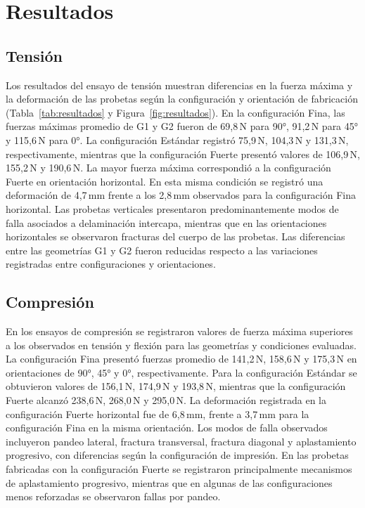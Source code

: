 \documentclass[10pt,twocolumn]{article}
\begin{document}
\section{Resultados}
\subsection{Tensión}
Los resultados del ensayo de tensión muestran diferencias en la fuerza máxima y la deformación de las probetas según la configuración y orientación de fabricación (Tabla~\ref{tab:resultados} y Figura~\ref{fig:resultados}). En la configuración Fina, las fuerzas máximas promedio de G1 y G2 fueron de 69,8\,N para 90°, 91,2\,N para 45° y 115,6\,N para 0°. La configuración Estándar registró 75,9\,N, 104,3\,N y 131,3\,N, respectivamente, mientras que la configuración Fuerte presentó valores de 106,9\,N, 155,2\,N y 190,6\,N. La mayor fuerza máxima correspondió a la configuración Fuerte en orientación horizontal. En esta misma condición se registró una deformación de 4,7\,mm frente a los 2,8\,mm observados para la configuración Fina horizontal. Las probetas verticales presentaron predominantemente modos de falla asociados a delaminación intercapa, mientras que en las orientaciones horizontales se observaron fracturas del cuerpo de las probetas. Las diferencias entre las geometrías G1 y G2 fueron reducidas respecto a las variaciones registradas entre configuraciones y orientaciones.
\subsection{Compresión}
En los ensayos de compresión se registraron valores de fuerza máxima superiores a los observados en tensión y flexión para las geometrías y condiciones evaluadas. La configuración Fina presentó fuerzas promedio de 141,2\,N, 158,6\,N y 175,3\,N en orientaciones de 90°, 45° y 0°, respectivamente. Para la configuración Estándar se obtuvieron valores de 156,1\,N, 174,9\,N y 193,8\,N, mientras que la configuración Fuerte alcanzó 238,6\,N, 268,0\,N y 295,0\,N. La deformación registrada en la configuración Fuerte horizontal fue de 6,8\,mm, frente a 3,7\,mm para la configuración Fina en la misma orientación. Los modos de falla observados incluyeron pandeo lateral, fractura transversal, fractura diagonal y aplastamiento progresivo, con diferencias según la configuración de impresión. En las probetas fabricadas con la configuración Fuerte se registraron principalmente mecanismos de aplastamiento progresivo, mientras que en algunas de las configuraciones menos reforzadas se observaron fallas por pandeo.
\end{document}

